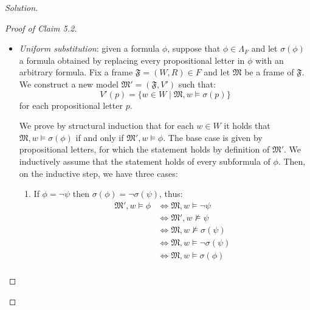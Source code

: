 \documentclass[12pt,a4paper]{report}
\theoremstyle{definition}
\newcommand{\model}[1]{\mathfrak{#1}}           %
\begin{document}
\begin{proof}[Solution]
\begin{proof}[Proof of Claim 5.2]
\begin{itemize}
                \item \textit{Uniform substitution}: given a formula $\phi$, suppose that $\phi \in \Lambda_{F}$ and let $\sigma(\phi)$ a formula obtained by replacing every propositional letter in $\phi$ with an arbitrary formula. Fix a frame $\model{F} = (W,R) \in F$ and let $\model{M}$ be a frame of $\model{F}$. We construct a new model $\model{M'} = (\model{F}, V')$ such that:
                \[V'(p) = \{w \in W \mid \model{M}, w \models \sigma(p)\}\]
                for each propositional letter $p$.
                
                We prove by structural induction that for each $w \in W$ it holds that $\model{M}, w \models \sigma(\phi)$ if and only if $\model{M'}, w \models \phi$. The base case is given by propositional letters, for which the statement holds by definition of $\model{M'}$. We inductively assume that the statement holds of every subformula of $\phi$. Then, on the inductive step, we have three cases:
                \begin{enumerate}
                    \item If $\phi = \lnot \psi$ then $\sigma(\phi) = \lnot \sigma(\psi)$, thus:
                    \[\begin{split}
                        \model{M'}, w \models \phi &\iff \model{M}, w \models \lnot \psi \\
                        & \iff \model{M'}, w \not\models \psi \\
                        & \iff \model{M}, w \not\models \sigma(\psi) \\
                        & \iff \model{M}, w \models \lnot \sigma(\psi) \\
                        & \iff \model{M}, w \models \sigma(\phi) \\
                    \end{split}\]


\end{enumerate}
\end{itemize}
\end{proof}
\end{proof}
\end{document}
